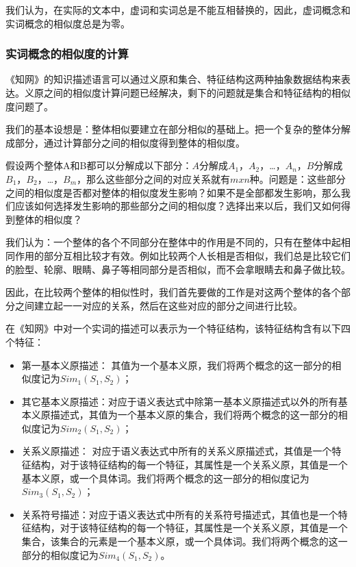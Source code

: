 \documentclass[11pt,a4paper]{article}
\begin{document}
我们认为，在实际的文本中，虚词和实词总是不能互相替换的，因此，虚词概念和实词概念的相似度总是为零。

\subsubsection{实词概念的相似度的计算}

《知网》的知识描述语言可以通过义原和集合、特征结构这两种抽象数据结构来表达。义原之间的相似度计算问题已经解决，剩下的问题就是集合和特征结构的相似度问题了。

我们的基本设想是：整体相似要建立在部分相似的基础上。把一个复杂的整体分解成部分，通过计算部分之间的相似度得到整体的相似度。

假设两个整体A和B都可以分解成以下部分：$A$分解成$A_{1}$，$A_{2}$，\ldots{}，$A_{n}$，$B$分解成$B_{1}$，$B_{2}$，\ldots{}，$B_{m}$，那么这些部分之间的对应关系就有$m x n$种。问题是：这些部分之间的相似度是否都对整体的相似度发生影响？如果不是全部都发生影响，那么我们应该如何选择发生影响的那些部分之间的相似度？选择出来以后，我们又如何得到整体的相似度？

我们认为：一个整体的各个不同部分在整体中的作用是不同的，只有在整体中起相同作用的部分互相比较才有效。例如比较两个人长相是否相似，我们总是比较它们的脸型、轮廓、眼睛、鼻子等相同部分是否相似，而不会拿眼睛去和鼻子做比较。

因此，在比较两个整体的相似性时，我们首先要做的工作是对这两个整体的各个部分之间建立起一一对应的关系，然后在这些对应的部分之间进行比较。


在《知网》中对一个实词的描述可以表示为一个特征结构，该特征结构含有以下四个特征：
\begin{itemize}
\item 第一基本义原描述： 其值为一个基本义原，我们将两个概念的这一部分的相似度记为$Sim_{1}(S_{1},S_{2})$；

\item 其它基本义原描述：对应于语义表达式中除第一基本义原描述式以外的所有基本义原描述式，其值为一个基本义原的集合，我们将两个概念的这一部分的相似度记为$Sim_{2}(S_{1},S_{2})$；

\item 关系义原描述： 对应于语义表达式中所有的关系义原描述式，其值是一个特征结构，对于该特征结构的每一个特征，其属性是一个关系义原，其值是一个基本义原，或一个具体词。我们将两个概念的这一部分的相似度记为$Sim_{3}(S_{1},S_{2})$；

\item 关系符号描述：对应于语义表达式中所有的关系符号描述式，其值也是一个特征结构，对于该特征结构的每一个特征，其属性是一个关系义原，其值是一个集合，该集合的元素是一个基本义原，或一个具体词。我们将两个概念的这一部分的相似度记为$Sim_{4}(S_{1},S_{2})$。
\end{itemize}
\end{document}
